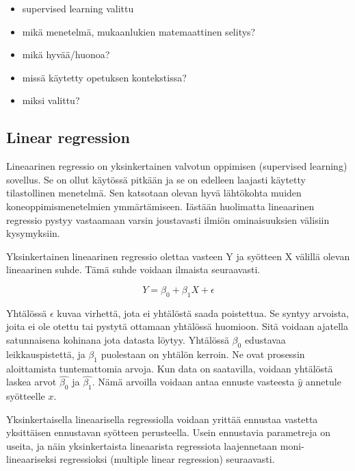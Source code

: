 \documentclass[finnish,twoside,openright]{HYgraduMLDS}
\begin{document}
\begin{itemize}
    \item supervised learning valittu
\end{itemize}

\begin{itemize}
    \item mikä menetelmä, mukaanlukien matemaattinen selitys?
    \item mikä hyvää/huonoa?
    \item missä käytetty opetuksen kontekstissa?
    \item miksi valittu?
\end{itemize}

\subsection{Linear regression}

Lineaarinen regressio on yksinkertainen valvotun oppimisen (supervised learning) sovellus\cite{james2013ISLR}. Se on ollut käytössä pitkään ja se on edelleen laajasti käytetty tilastollinen menetelmä. Sen katsotaan olevan hyvä lähtökohta muiden koneoppimismenetelmien ymmärtämiseen. Iästään huolimatta lineaarinen regressio pystyy vastaamaan varsin joustavasti ilmiön ominaisuuksien välisiin kysymyksiin. 

Yksinkertainen lineaarinen regressio olettaa vasteen Y ja syötteen X välillä olevan lineaarinen suhde. Tämä suhde voidaan ilmaista seuraavasti. 

\begin{equation} \label{eq:1}
    Y = \beta_0 + \beta_1 X + \epsilon
\end{equation}

Yhtälössä $\epsilon$ kuvaa virhettä, jota ei yhtälöstä saada poistettua. Se syntyy arvoista, joita ei ole otettu tai pystytä ottamaan yhtälössä huomioon. Sitä voidaan ajatella satunnaisena kohinana jota datasta löytyy. Yhtälössä $\beta_0$ edustavaa leikkauspistettä, ja $\beta_1$ puolestaan on yhtälön kerroin. Ne ovat prosessin aloittamista tuntemattomia arvoja. Kun data on saatavilla, voidaan yhtälöstä laskea arvot $\hat{\beta_0}$ ja $\hat{\beta_1}$. Nämä arvoilla voidaan antaa ennuste vasteesta $\hat{y}$ annetule syötteelle $x$.

Yksinkertaisella lineaarisella regressiolla voidaan yrittää ennustaa vastetta yksittäisen ennustavan syötteen perusteella. Usein ennustavia parametreja on useita, ja näin yksinkertaista lineaarista regressiota laajennetaan moni-lineaariseksi regressioksi (multiple linear regression) seuraavasti.
\end{document}
